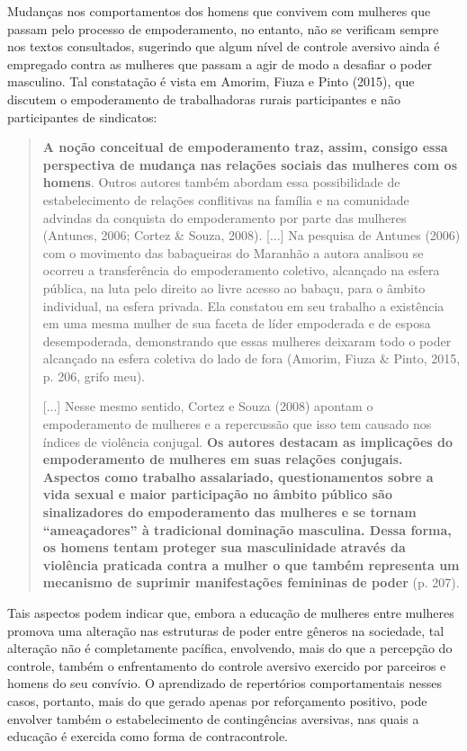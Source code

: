Mudanças nos comportamentos dos homens que convivem com mulheres que passam pelo processo de empoderamento, no entanto, não se verificam sempre nos textos consultados, sugerindo que algum nível de controle aversivo ainda é empregado contra as mulheres que passam a agir de modo a desafiar o poder masculino. Tal constatação é vista em Amorim, Fiuza e Pinto (2015), que discutem o empoderamento de trabalhadoras rurais participantes e não participantes de sindicatos:

\begin{quote}
    \textbf{A noção conceitual de empoderamento traz, assim, consigo essa perspectiva de mudança nas relações sociais das mulheres com os homens}. Outros autores também abordam essa possibilidade de estabelecimento de relações conflitivas na família e na comunidade advindas da conquista do empoderamento por parte das mulheres (Antunes, 2006; Cortez \& Souza, 2008). [...] Na pesquisa de Antunes (2006) com o movimento das babaçueiras do Maranhão a autora analisou se ocorreu a transferência do empoderamento coletivo, alcançado na esfera pública, na luta pelo direito ao livre acesso ao babaçu, para o âmbito individual, na esfera privada. Ela constatou em seu trabalho a existência em uma mesma mulher de sua faceta de líder empoderada e de esposa desempoderada, demonstrando que essas mulheres deixaram todo o poder alcançado na esfera coletiva do lado de fora (Amorim, Fiuza \& Pinto, 2015, p. 206, grifo meu).

    [...] Nesse mesmo sentido, Cortez e Souza (2008) apontam o empoderamento de mulheres e a repercussão que isso tem causado nos índices de violência conjugal. \textbf{Os autores destacam as implicações do empoderamento de mulheres em suas relações conjugais. Aspectos como trabalho assalariado, questionamentos sobre a vida sexual e maior participação no âmbito público são sinalizadores do empoderamento das mulheres e se tornam “ameaçadores” à tradicional dominação masculina. Dessa forma, os homens tentam proteger sua masculinidade através da violência praticada contra a mulher o que também representa um mecanismo de suprimir manifestações femininas de poder} (p. 207).
\end{quote}

Tais aspectos podem indicar que, embora a educação de mulheres entre mulheres promova uma alteração nas estruturas de poder entre gêneros na sociedade, tal alteração não é completamente pacífica, envolvendo, mais do que a percepção do controle, também o enfrentamento do controle aversivo exercido por parceiros e homens do seu convívio. O aprendizado de repertórios comportamentais nesses casos, portanto, mais do que gerado apenas por reforçamento positivo, pode envolver também o estabelecimento de contingências aversivas, nas quais a educação é exercida como forma de contracontrole.

